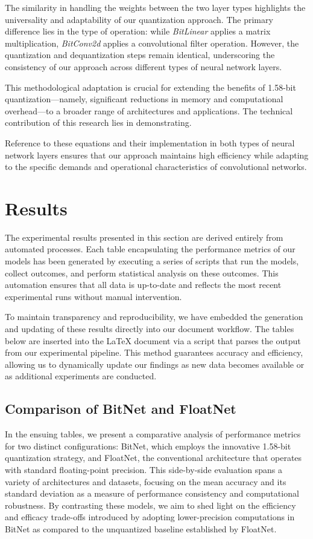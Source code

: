 \documentclass{article}
\begin{document}
The similarity in handling the weights between the two layer types highlights the universality and adaptability of our quantization approach. The primary difference lies in the type of operation: while \textit{BitLinear} applies a matrix multiplication, \textit{BitConv2d} applies a convolutional filter operation. However, the quantization and dequantization steps remain identical, underscoring the consistency of our approach across different types of neural network layers.

This methodological adaptation is crucial for extending the benefits of 1.58-bit quantization—namely, significant reductions in memory and computational overhead—to a broader range of architectures and applications. The technical contribution of this research lies in demonstrating.

Reference to these equations and their implementation in both types of neural network layers ensures that our approach maintains high efficiency while adapting to the specific demands and operational characteristics of convolutional networks.


\section{Results}

The experimental results presented in this section are derived entirely from automated processes. Each table encapsulating the performance metrics of our models has been generated by executing a series of scripts that run the models, collect outcomes, and perform statistical analysis on these outcomes. This automation ensures that all data is up-to-date and reflects the most recent experimental runs without manual intervention.

To maintain transparency and reproducibility, we have embedded the generation and updating of these results directly into our document workflow. The tables below are inserted into the LaTeX document via a script that parses the output from our experimental pipeline. This method guarantees accuracy and efficiency, allowing us to dynamically update our findings as new data becomes available or as additional experiments are conducted.

\subsection{Comparison of BitNet and FloatNet}

In the ensuing tables, we present a comparative analysis of performance metrics for two distinct configurations: BitNet, which employs the innovative 1.58-bit quantization strategy, and FloatNet, the conventional architecture that operates with standard floating-point precision. This side-by-side evaluation spans a variety of architectures and datasets, focusing on the mean accuracy and its standard deviation as a measure of performance consistency and computational robustness. By contrasting these models, we aim to shed light on the efficiency and efficacy trade-offs introduced by adopting lower-precision computations in BitNet as compared to the unquantized baseline established by FloatNet.
\end{document}
